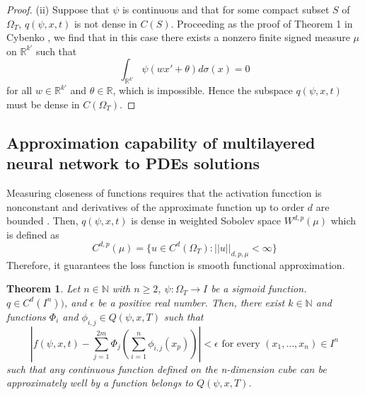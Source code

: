 \documentclass{article}
\newtheorem{theorem}{Theorem}[section]
\begin{document}
\begin{proof}
	    (ii) Suppose that $\psi$ is continuous and that for some compact subset $S$ of $\Omega_{T}$, $q(\psi,x,t)$ is not dense in $C(S)$. Proceeding as the proof of Theorem 1 in Cybenko \cite{cybenko}, we find that in this case there exists a nonzero finite signed measure $\mu$ on $\mathbb R^{k'}$ such that
	    \[ \int_{\mathbb{R}^{k'}} \psi(wx'+\theta)d \sigma(x) = 0\]
	    for all $w \in\mathbb{R}^{k'}$ and $\theta \in \mathbb{R}$, which is impossible.
Hence the subspace $q(\psi, x, t)$ must be dense in $C(\Omega_{T})$.
\end{proof}
\subsection{Approximation capability of multilayered neural network to PDEs solutions}


Measuring closeness of functions requires that the activation funcction is nonconstant and derivatives of the approximate function up to order $d$ are bounded \cite{hornik}. 
Then, $q(\psi,x,t)$ is dense in weighted Sobolev space $W^{d,p}(\mu)$ which is defined as \cite{hornik}
\begin{equation}
C^{d,p}(\mu) = \{ u \in C^{d}(\Omega_{T}): ||u||_{d,p,\mu} < \infty \}
\end{equation}
Therefore, it guarantees the loss function is smooth functional approximation.



\begin{theorem}  \label{nn_proof}
	Let $n \in \mathbb{N}$ with $n \geq 2$, $\psi: \Omega_{T} \rightarrow \textit{I}$ be a sigmoid function. $q \in C^{d}(I^{n}))$, and $\epsilon$ be a positive real number. 
Then, there exist $k \in \mathbb{N}$ and functions $\Phi_{i}$ and $\phi_{i,j} \in Q(\psi,x,T)$ such that
	\begin{equation}
	\left|f(\psi,x,t)-\sum_{j=1}^{2m}\Phi_{j}\left(\sum_{i=1}^{n}\phi_{i,j}(x_p)\right)\right| < \epsilon \text{ for every } (x_1, \dots, x_n) \in I^{n}
	\end{equation}
	such that any continuous function defined on the n-dimension cube can be approximately well by a function belongs to $Q(\psi,x,T)$.
\end{theorem}
\end{document}
